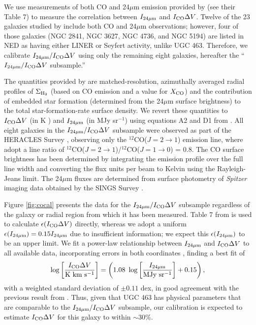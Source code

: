 \documentclass[apj,iop,numberedappendix]{emulateapj}
\begin{document}
We use measurements of both CO and 24$\mu$m emission provided by
 (see their Table 7) to measure the correlation
between $I_{24\mu{\rm m}}$ and $I_{\rm CO}\Delta V$.  Twelve of the 23 galaxies studied by
 include both CO and 24$\mu$m observations;
however, four of those galaxies (NGC 2841, NGC 3627, NGC 4736, and NGC 5194) are
listed in NED as having either LINER or Seyfert activity, unlike UGC 463.
Therefore, we calibrate $I_{24\mu{\rm m}}/I_{\rm CO}\Delta V$ using only the remaining
eight galaxies, hereafter the ``$I_{24\mu{\rm m}}/I_{\rm CO}\Delta V$ subsample.''

The quantities provided by  are
matched-resolution, azimuthally averaged radial profiles of $\Sigma_{\rm H_2}$
(based on CO emission and a value for $X_{\rm CO}$) and the contribution of embedded
star formation (determined from the 24$\mu$m surface brightness) to the total
star-formation-rate surface density.  We revert these quantities to $I_{\rm CO}\Delta V$ (in K
\kms) and $I_{24\mu{\rm m}}$ (in MJy sr$^{-1}$) using equations A2 and D1 from
.  All eight galaxies in the $I_{24\mu{\rm m}}/I_{\rm CO}\Delta V$
subsample were observed as part of the HERACLES Survey
\citep{2009AJ....137.4670L}, observing only the $^{12}$CO($J=2 \rightarrow 1$)
emission line, where  adopt a line ratio of
$^{12}$CO($J=2 \rightarrow 1$)/$^{12}$CO($J=1 \rightarrow 0$) = 0.8.  The CO
surface brightness has been determined by integrating the emission profile over
the full line width and converting the flux units per beam to Kelvin using the
Rayleigh-Jeans limit.  The 24$\mu$m fluxes are determined from surface
photometry of {\it Spitzer} imaging data obtained by the SINGS Survey
\citep{2003PASP..115..928K}.

Figure \ref{fig:cocal} presents the data for the $I_{24\mu{\rm m}}/I_{\rm CO}\Delta V$ subsample
regardless of the galaxy or radial region from which it has been measured.
Table 7 from  is used to calculate
$\epsilon(I_{\rm CO}\Delta V)$ directly, whereas we adopt a uniform $\epsilon(I_{24\mu{\rm m}}) =
0.15I_{24\mu{\rm m}}$ due to insufficient information; we expect this $\epsilon(I_{24\mu{\rm m}})$ to be
an upper limit.  We fit a power-law relationship between $I_{24\mu{\rm m}}$ and $I_{\rm CO}\Delta V$ to
all available data, incorporating errors in both coordinates \citep[
of][]{NR3}, finding a best fit of
%
\begin{equation}
%
\log\left[ \frac{\ico}{\rm K\ km\ s^{-1}}\right] = \left(1.08\ \log\left[
\frac{\imi}{\rm MJy\ sr^{-1}}\right] + 0.15\right),
%
\label{eq:24_co_fit}
%
\end{equation}
%
with a weighted standard deviation of $\pm0.11$ dex, in good agreement with the
previous result from \citet{2006A&A...456..847P}.  Thus, given that UGC 463 has
physical parameters that are comparable to the $I_{24\mu{\rm m}}/I_{\rm CO}\Delta V$ subsample, our
calibration is expected to estimate $I_{\rm CO}\Delta V$ for this galaxy to within $\sim30$\%.
\end{document}
